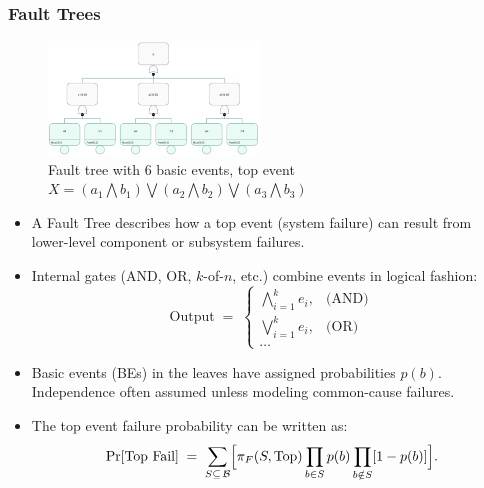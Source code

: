 \begin{frame}[t, allowframebreaks]
\frametitle{Fault Trees}
    \begin{figure}[h]
    \centering
    \includegraphics[width=0.5\textwidth]{1_concepts/ft.png}
    \caption{Fault tree with 6 basic events, top event $X = (a_1\bigwedge b_1) \bigvee (a_2\bigwedge b_2) \bigvee (a_3\bigwedge b_3)$}
    \label{fig:ft}
\end{figure}
\begin{itemize}
  \item A Fault Tree describes how a top event (system failure) can result from lower-level component or subsystem failures.
  \item Internal gates (AND, OR, \(k\)-of-\(n\), etc.) combine events in logical fashion:
    \[
      \text{Output} \;=\;
      \begin{cases}
         \bigwedge_{i=1}^k e_i, & \text{(AND)}\\
         \bigvee_{i=1}^k e_i, & \text{(OR)}\\
         \dots
      \end{cases}
    \]
  \item Basic events (BEs) in the leaves have assigned probabilities \(p(b)\).  Independence often assumed unless modeling common-cause failures.
  \item The top event failure probability can be written as:
    \begin{equation}
    \label{eq:top_event_probability_slides}
    \Pr[\text{Top Fail}] \;=\; \sum_{S \subseteq \,\mathcal{B}} 
      \Bigl[
        \pi_{F}(S, \text{Top}) 
        \prod_{b\in S} p(b)\prod_{b\notin S}[1 - p(b)]
      \Bigr].
    \end{equation}
\end{itemize}
\end{frame}

